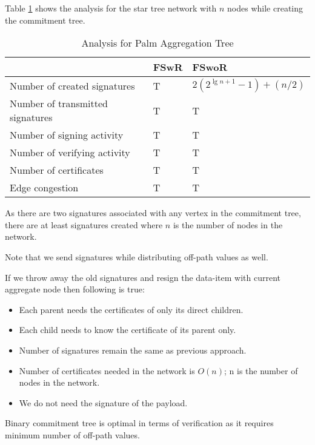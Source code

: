   Table \ref{table:Analysis table for Palm Aggregation Tree} shows the analysis for the star tree network with $n$ nodes while creating the commitment tree.
	\begin{table}[!htb]	
		\begin{center}
			\begin{tabular}{ |l| l| l| }
		    \hline
		    & FSwR & FSwoR \\
		    \hline
		    Number of created signatures & T & $2 (2^{\lg n + 1} - 1) + (n / 2)$ \\	
		    \hline
		    Number of transmitted signatures & T & T\\
		    \hline
		    Number of signing activity & T & T \\
		    \hline
		    Number of verifying activity & T & T \\
		    \hline
		    Number of certificates & T & T \\
		    \hline
		    Edge congestion & T & T\\
		    \hline
			\end{tabular}
		\end{center}
  	\caption{Analysis for Palm Aggregation Tree}
	  \label{table:Analysis table for Palm Aggregation Tree}
  \end{table}
	As there are two signatures associated with any vertex in the commitment tree, there are at least  signatures created where $n$ is the number of nodes in the network.
	
	Note that we send signatures while distributing off-path values as well.

	If we throw away the old signatures and resign the data-item with current aggregate node then following is true:
		\begin{itemize}
			\item Each parent needs the certificates of only its direct children.
			\item Each child needs to know the certificate of its parent only.
			\item Number of signatures remain the same as previous approach.
			\item Number of certificates needed in the network is $O(n)$; n is the number of nodes in the network.
			\item We do not need the signature of the payload.
		\end{itemize}

	\begin{theorem}
		\label{Commitment tree}
		Binary commitment tree is optimal in terms of verification as it requires minimum number of off-path values.
	\end{theorem}

